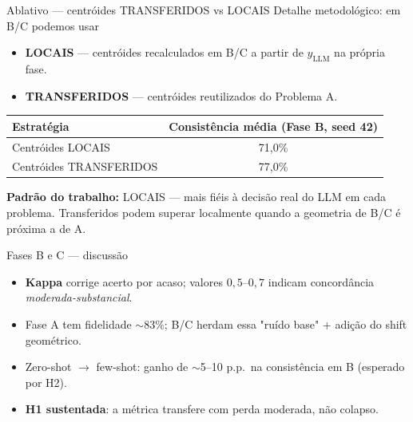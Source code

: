 \documentclass[aspectratio=169,10pt]{beamer}
\begin{document}
\begin{frame}{Ablativo --- centr\'oides TRANSFERIDOS vs LOCAIS}
  \footnotesize
  Detalhe metodol\'ogico: em B/C podemos usar
  \begin{itemize}
    \item \textbf{LOCAIS} --- centr\'oides recalculados em B/C a partir de $y_{\text{LLM}}$ na pr\'opria fase.
    \item \textbf{TRANSFERIDOS} --- centr\'oides reutilizados do Problema A.
  \end{itemize}
  \medskip
  \begin{center}
  \begin{tabular}{lc}
    \toprule
    Estrat\'egia & Consist\^encia m\'edia (Fase B, seed 42) \\
    \midrule
    Centr\'oides LOCAIS       & 71{,}0\% \\
    Centr\'oides TRANSFERIDOS & 77{,}0\% \\
    \bottomrule
  \end{tabular}
  \end{center}
  \medskip
  \textbf{Padr\~ao do trabalho:} LOCAIS --- mais fi\'eis \`a decis\~ao real do LLM em cada problema. Transferidos podem superar localmente quando a geometria de B/C \'e pr\'oxima a de A.
\end{frame}

\begin{frame}{Fases B e C --- discuss\~ao}
  \footnotesize
  \begin{itemize}
    \item \textbf{Kappa} corrige acerto por acaso; valores $0{,}5$--$0{,}7$ indicam concord\^ancia \emph{moderada-substancial}.
    \item Fase A tem fidelidade $\sim 83\%$; B/C herdam essa "ru\'ido base" + adi\c{c}\~ao do shift geom\'etrico.
    \item Zero-shot $\to$ few-shot: ganho de $\sim$5--10 p.p.\ na consist\^encia em B (esperado por H2).
    \item \textbf{H1 sustentada}: a m\'etrica transfere com perda moderada, n\~ao colapso.
  \end{itemize}
\end{frame}
\end{document}
